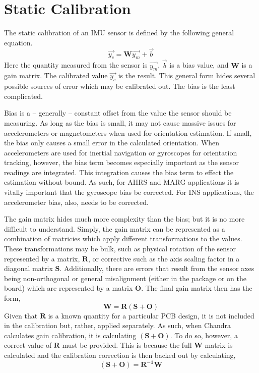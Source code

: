 \documentclass[10pt,letterpaper]{memoir} %
\begin{document}
\section{Static Calibration}
The static calibration of an IMU sensor is defined by the following general equation.
\begin{equation}
	\vec{y_c} = \mathbf{W}\vec{y_m} + \vec{b}
\end{equation}
Here the quantity measured from the sensor is $\vec{y_m}$, $\vec{b}$ is a bias value, and $\mathbf{W}$ is a gain matrix.  The calibrated value $\vec{y_c}$ is the result.  This general form hides several possible sources of error which may be calibrated out.  The bias is the least complicated.

Bias is a -- generally -- constant offset from the value the sensor should be measuring.  As long as the bias is small, it may not cause massive issues for accelerometers or magnetometers when used for orientation estimation.  If small, the bias only causes a small error in the calculated orientation.  When accelerometers are used for inertial navigation or gyroscopes for orientation tracking, however, the bias term becomes especially important as the sensor readings are integrated.  This integration causes the bias term to effect the estimation without bound.  As such, for AHRS and MARG applications it is vitally important that the gyroscope bias be corrected.  For INS applications, the accelerometer bias, also, needs to be corrected.

The gain matrix hides much more complexity than the bias; but it is no more difficult to understand.  Simply, the gain matrix can be represented as a combination of matricies which apply different transformations to the values.  These transformations may be bulk, such as physical rotation of the sensor represented by a matrix, $\mathbf{R}$, or corrective such as the axis scaling factor in a diagonal matrix $\mathbf{S}$.  Additionally, there are errors that result from the sensor axes being non-orthogonal or general misalignment (either in the package or on the board) which are represented by a matrix $\mathbf{O}$.  The final gain matrix then has the form,
\begin{equation}
	\mathbf{W} = \mathbf{R}(\mathbf{S}+\mathbf{O})
\end{equation}
Given that $\mathbf{R}$ is a known quantity for a particular PCB design, it is not included in the calibration but, rather, applied separately.  As such, when Chandra calculates gain calibration, it is calculating $(\mathbf{S}+\mathbf{O})$.  To do so, however, a correct value of $\mathbf{R}$ must be provided.  This is because the full $\mathbf{W}$ matrix is calculated and the calibration correction is then backed out by calculating,
\begin{equation}
	(\mathbf{S}+\mathbf{O}) = \mathbf{R^{-1}}\mathbf{W}
\end{equation}
\end{document}
